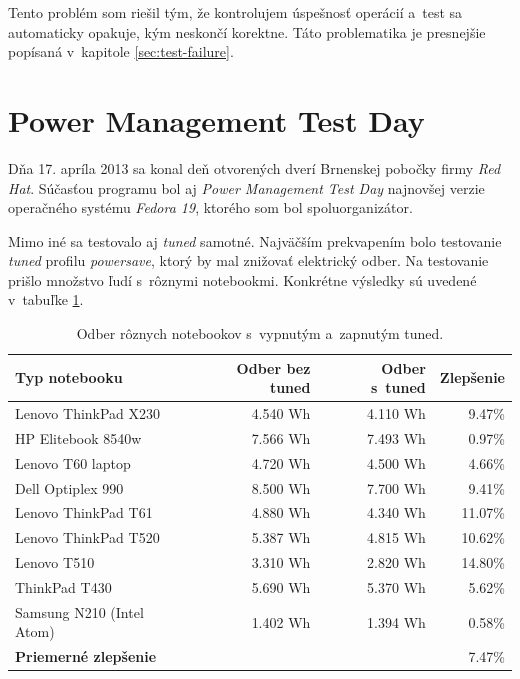 Tento problém som riešil tým, že kontrolujem úspešnosť operácií a~test sa
automaticky opakuje, kým neskončí korektne. Táto problematika je presnejšie
popísaná v~kapitole \ref{sec:test-failure}.

%
%

\section{Power Management Test Day}

Dňa 17. apríla 2013 sa konal deň otvorených dverí Brnenskej pobočky firmy
\emph{Red Hat}. Súčasťou programu bol aj \emph{Power Management Test Day}
najnovšej verzie operačného systému \emph{Fedora 19}, ktorého som bol
spoluorganizátor. 

Mimo iné sa testovalo aj \emph{tuned} samotné. Najväčším prekvapením bolo
testovanie \emph{tuned} profilu \emph{powersave}, ktorý by mal znižovať
elektrický odber. Na testovanie prišlo množstvo ľudí s~rôznymi notebookmi.
Konkrétne výsledky sú uvedené v~tabuľke \ref{tab:testday-results}.

\begin{table}[H]
\begin{center}
\begin{tabular}{|l|r|r|r|}
    \hline
    \textbf{Typ notebooku} & \textbf{Odber bez tuned} & \textbf{Odber s~tuned} & \textbf{Zlepšenie} \\
    \hline
    Lenovo ThinkPad X230        & 4.540 Wh & 4.110 Wh & 9.47\% \\
    HP Elitebook 8540w          & 7.566 Wh & 7.493 Wh & 0.97\% \\
    Lenovo T60 laptop           & 4.720 Wh & 4.500 Wh & 4.66\% \\
    Dell Optiplex 990           & 8.500 Wh & 7.700 Wh & 9.41\% \\
    Lenovo ThinkPad T61         & 4.880 Wh & 4.340 Wh & 11.07\% \\
    Lenovo ThinkPad T520        & 5.387 Wh & 4.815 Wh & 10.62\% \\
    Lenovo T510                 & 3.310 Wh & 2.820 Wh & 14.80\% \\
    ThinkPad T430               & 5.690 Wh & 5.370 Wh & 5.62\% \\
    Samsung N210 (Intel Atom)   & 1.402 Wh & 1.394 Wh & 0.58\% \\
    \hline
    \textbf{Priemerné zlepšenie} & \multicolumn{3}{|r|}{7.47\%} \\
    \hline
\end{tabular}
\caption{Odber rôznych notebookov s~vypnutým a~zapnutým tuned.}
\label{tab:testday-results}
\end{center}
\end{table}

